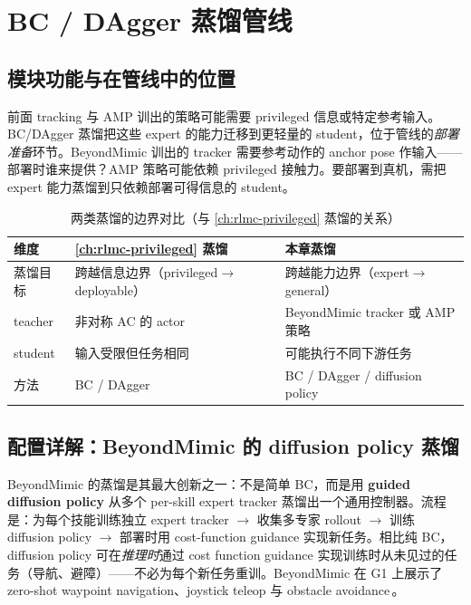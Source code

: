 \section{BC / DAgger 蒸馏管线}
\label{sec:rlmc-imit-bc}

\subsection{模块功能与在管线中的位置}
\label{sec:rlmc-imit-bc-pos}

前面 tracking 与 AMP 训出的策略可能需要 privileged 信息或特定参考输入。BC/DAgger 蒸馏把这些 expert 的能力迁移到更轻量的 student，位于管线的\emph{部署准备}环节。BeyondMimic 训出的 tracker 需要参考动作的 anchor pose 作输入——部署时谁来提供？AMP 策略可能依赖 privileged 接触力。要部署到真机，需把 expert 能力蒸馏到只依赖部署可得信息的 student。

\begin{table}[ht]
\centering
\small
\caption{两类蒸馏的边界对比（与 \cref{ch:rlmc-privileged} 蒸馏的关系）}
\label{tab:rlmc-imit-bc-compare}
\begin{tabular}{@{}lll@{}}
\toprule
维度 & \cref{ch:rlmc-privileged} 蒸馏 & 本章蒸馏 \\
\midrule
蒸馏目标 & 跨越信息边界（privileged$\to$deployable） & 跨越能力边界（expert$\to$general） \\
teacher & 非对称 AC 的 actor & BeyondMimic tracker 或 AMP 策略 \\
student & 输入受限但任务相同 & 可能执行不同下游任务 \\
方法 & BC / DAgger & BC / DAgger / diffusion policy \\
\bottomrule
\end{tabular}
\end{table}

\subsection{配置详解：BeyondMimic 的 diffusion policy 蒸馏}
\label{sec:rlmc-imit-bc-diffusion}

BeyondMimic 的蒸馏是其最大创新之一：不是简单 BC，而是用 \textbf{guided diffusion policy} 从多个 per-skill expert tracker 蒸馏出一个通用控制器。流程是：为每个技能训练独立 expert tracker $\to$ 收集多专家 rollout $\to$ 训练 diffusion policy $\to$ 部署时用 cost-function guidance 实现新任务。相比纯 BC，diffusion policy 可在\emph{推理时}通过 cost function guidance 实现训练时从未见过的任务（导航、避障）——不必为每个新任务重训。BeyondMimic 在 G1 上展示了 zero-shot waypoint navigation、joystick teleop 与 obstacle avoidance\,\cite{liao2025beyondmimic}。

